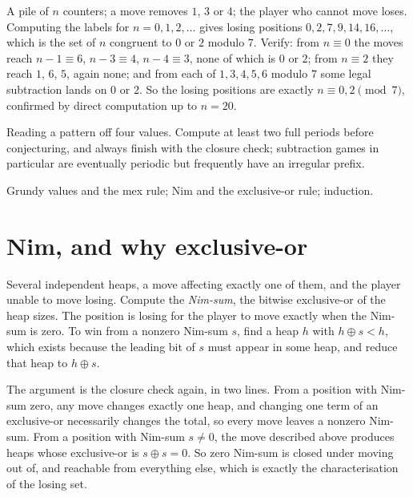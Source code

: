 \begin{worked}
A pile of $n$ counters; a move removes $1$, $3$ or $4$; the player who cannot move loses. Computing the labels for $n=0,1,2,\ldots$ gives losing positions $0,2,7,9,14,16,\ldots$, which is the set of $n$ congruent to $0$ or $2$ modulo $7$. Verify: from $n\equiv0$ the moves reach $n-1\equiv6$, $n-3\equiv4$, $n-4\equiv3$, none of which is $0$ or $2$; from $n\equiv2$ they reach $1$, $6$, $5$, again none; and from each of $1,3,4,5,6$ modulo $7$ some legal subtraction lands on $0$ or $2$. So the losing positions are exactly $n\equiv0,2\pmod 7$, confirmed by direct computation up to $n=20$.
\end{worked}

\begin{trap}
Reading a pattern off four values. Compute at least two full periods before conjecturing, and always finish with the closure check; subtraction games in particular are eventually periodic but frequently have an irregular prefix.
\end{trap}

\begin{seealsob}Grundy values and the mex rule; Nim and the exclusive-or rule; induction.\end{seealsob}

\section{Nim, and why exclusive-or}

\cue Several independent heaps, a move affecting exactly one of them, and the player unable to move losing.
\method Compute the \emph{Nim-sum}, the bitwise exclusive-or of the heap sizes. The position is losing for the player to move exactly when the Nim-sum is zero. To win from a nonzero Nim-sum $s$, find a heap $h$ with $h\oplus s<h$, which exists because the leading bit of $s$ must appear in some heap, and reduce that heap to $h\oplus s$.

\begin{keynote}
The argument is the closure check again, in two lines. From a position with Nim-sum zero, any move changes exactly one heap, and changing one term of an exclusive-or necessarily changes the total, so every move leaves a nonzero Nim-sum. From a position with Nim-sum $s\neq0$, the move described above produces heaps whose exclusive-or is $s\oplus s=0$. So zero Nim-sum is closed under moving out of, and reachable from everything else, which is exactly the characterisation of the losing set.
\end{keynote}

